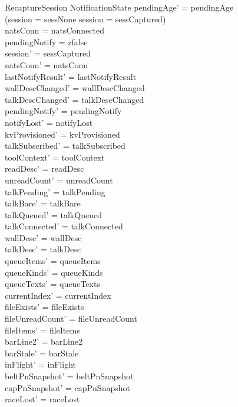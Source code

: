 \documentclass[a4paper,10pt,fleqn]{article}
\begin{document}
\begin{schema}{RecaptureSession}
  \Delta NotificationState
  \where
  pendingAge' = pendingAge \\
  (session = sessNone \lor session = sessCaptured) \\
  natsConn = natsConnected \\
  pendingNotify = zfalse \\
  session' = sessCaptured \\
  natsConn' = natsConn \\
  lastNotifyResult' = lastNotifyResult \\
  wallDescChanged' = wallDescChanged \\
  talkDescChanged' = talkDescChanged \\
  pendingNotify' = pendingNotify \\
  notifyLost' = notifyLost \\
  kvProvisioned' = kvProvisioned \\
  talkSubscribed' = talkSubscribed \\
  toolContext' = toolContext \\
  readDesc' = readDesc \\
  unreadCount' = unreadCount \\
  talkPending' = talkPending \\
  talkBare' = talkBare \\
  talkQueued' = talkQueued \\
  talkConnected' = talkConnected \\
  wallDesc' = wallDesc \\
  talkDesc' = talkDesc \\
  queueItems' = queueItems \\
  queueKinds' = queueKinds \\
  queueTexts' = queueTexts \\
  currentIndex' = currentIndex \\
  fileExists' = fileExists \\
  fileUnreadCount' = fileUnreadCount \\
  fileItems' = fileItems \\
  barLine2' = barLine2 \\
  barStale' = barStale \\
  inFlight' = inFlight \\
  beltPnSnapshot' = beltPnSnapshot \\
  capPnSnapshot' = capPnSnapshot \\
  raceLost' = raceLost \\

\end{schema}
\end{document}
